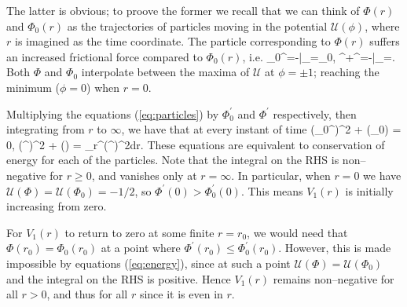 The latter is obvious; to proove the former we recall that we can think of $\Phi(r)$ and $\Phi_0(r)$ as the trajectories of particles moving in the potential $\mathcal{U}(\phi)$, where $r$ is imagined as the time coordinate. The particle corresponding to $\Phi(r)$ suffers an increased frictional force compared to $\Phi_0(r)$, i.e.
\be
\label{eq:particles}
\Phi_0^{\prime\prime}=-\bigg|_{\phi=\Phi_0},\qquad
\Phi^{\prime\prime}+\Phi^\prime=-\bigg|_{\phi=\Phi}.
\ee
Both $\Phi$ and $\Phi_0$ interpolate between the maxima of $\mathcal{U}$ at $\phi=\pm 1$; reaching the minimum ($\phi=0$) when $r=0$.

Multiplying the equations (\ref{eq:particles}) by $\Phi_0^\prime$ and $\Phi^\prime$ respectively, then integrating from $r$ to $\infty$, we have that at every instant of time
\be
\label{eq:energy}
(\Phi_0^\prime)^2 + (\Phi_0) = 0,\qquad
{}(\Phi^\prime)^2 + (\Phi) = \int_r^\infty{}(\Phi^\prime)^2dr.
\ee
These equations are equivalent to conservation of energy for each of the particles. Note that the integral on the RHS is non--negative for $r\geq 0$, and vanishes only at $r=\infty$. In particular, when $r=0$ we have $\mathcal{U}(\Phi)=\mathcal{U}(\Phi_0)=-1/2$, so $\Phi^\prime(0)>\Phi_0^\prime(0)$. This means $V_1(r)$ is initially increasing from zero.

For $V_1(r)$ to return to zero at some finite $r=r_0$, we would need that $\Phi(r_0)=\Phi_0(r_0)$ at a point where $\Phi^\prime(r_0)\leq\Phi_0^\prime(r_0)$. However, this is made impossible by equations (\ref{eq:energy}), since at such a point $\mathcal{U}(\Phi)=\mathcal{U}(\Phi_0)$ and the integral on the RHS is positive. Hence $V_1(r)$ remains non--negative for all $r>0$, and thus for all $r$ since it is even in $r$.
\koniec




